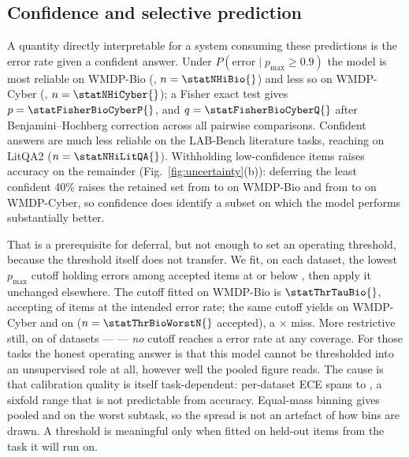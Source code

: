 \documentclass[conference,compsoc]{IEEEtran}
\newcommand{\pmax}{p_{\max}}
\begin{document}
\subsection{Confidence and selective prediction}
\label{sec:selective}

A quantity directly interpretable for a system consuming these predictions is the error
rate given a confident answer. Under $P(\text{error} \mid \pmax \geq 0.9)$ the model is
most reliable on WMDP-Bio (\statErrGivenHiBio{}, $n=\statNHiBio{}$) and less so on
WMDP-Cyber (\statErrGivenHiCyber{}, $n=\statNHiCyber{}$); a Fisher exact test gives $p =
\statFisherBioCyberP{}$, and $q = \statFisherBioCyberQ{}$ after Benjamini--Hochberg
correction across all pairwise comparisons. Confident answers are much less reliable on the
LAB-Bench literature tasks, reaching \statErrGivenHiLitQA{} on LitQA2 ($n=\statNHiLitQA{}$).
Withholding low-confidence items raises accuracy on the remainder
(Fig.~\ref{fig:uncertainty}(b)): deferring the least confident 40\% raises the retained set
from \statAccBio{} to \statRCBioAtSixtyPct{} on WMDP-Bio and from \statAccCyber{} to
\statRCCyberAtSixtyPct{} on WMDP-Cyber, so confidence does identify a subset on which the
model performs substantially better.

That is a prerequisite for deferral, but not enough to set an operating threshold, because
the threshold itself does not transfer. We fit, on each dataset, the lowest $\pmax$ cutoff
holding errors among accepted items at or below \statThrTarget{}, then apply it unchanged
elsewhere. The cutoff fitted on WMDP-Bio is $\statThrTauBio{}$, accepting
\statThrCovBio{} of items at the intended \statThrBioOnBio{} error rate; the same cutoff
yields \statThrBioOnCyber{} on WMDP-Cyber and \statThrBioWorst{} on
\statThrBioWorstLabel{} ($n = \statThrBioWorstN{}$ accepted), a
\statThrBioWorstRatio{}$\times$ miss. More restrictive still, on \statThrNUnachievable{} of
\statThrNDatasets{} datasets --- \statThrUnachievableList{} --- \emph{no} cutoff reaches a
\statThrTarget{} error rate at any coverage. For those tasks the honest operating answer is
that this model cannot be thresholded into an unsupervised role at all, however well the
pooled figure reads. The cause is that calibration quality is itself task-dependent:
per-dataset ECE spans \statEceSpreadMin{} to \statEceSpreadMax{}, a sixfold range that is
not predictable from accuracy. Equal-mass binning gives \statEceAdaptivePooled{} pooled and
\statEceAdaptiveSupp{} on the worst subtask, so the spread is not an artefact of how bins
are drawn. A threshold is meaningful only when fitted on held-out items from the task it
will run on.
\end{document}
